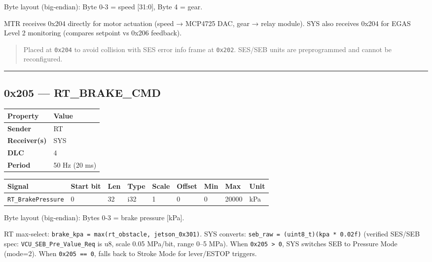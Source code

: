 Byte layout (big-endian): Byte 0-3 = speed {[}31:0{]}, Byte 4 = gear.

MTR receives 0x204 directly for motor actuation (speed → MCP4725 DAC, gear →
relay module). SYS also receives 0x204 for EGAS Level 2 monitoring (compares
setpoint vs 0x206 feedback).

\begin{quote}
Placed at \texttt{0x204} to avoid collision with SES error info frame at
\texttt{0x202}. SES/SEB units are preprogrammed and cannot be reconfigured.
\end{quote}

\begin{center}\rule{0.5\linewidth}{0.5pt}\end{center}

\subsection{0x205 --- RT\_BRAKE\_CMD}\label{x205-rt_brake_cmd}

\begin{longtable}[]{@{}ll@{}}
\toprule\noalign{}
Property & Value \\
\midrule\noalign{}
\endhead
\bottomrule\noalign{}
\endlastfoot
\textbf{Sender} & RT \\
\textbf{Receiver(s)} & SYS \\
\textbf{DLC} & 4 \\
\textbf{Period} & 50 Hz (20 ms) \\
\end{longtable}

\begin{longtable}[]{@{}lllllllll@{}}
\toprule\noalign{}
Signal & Start bit & Len & Type & Scale & Offset & Min & Max & Unit \\
\midrule\noalign{}
\endhead
\bottomrule\noalign{}
\endlastfoot
\texttt{RT\_BrakePressure} & 0 & 32 & i32 & 1 & 0 & 0 & 20000 & kPa \\
\end{longtable}

Byte layout (big-endian): Bytes 0-3 = brake pressure {[}kPa{]}.

RT max-select: \texttt{brake\_kpa\ =\ max(rt\_obstacle,\ jetson\_0x301)}. SYS
converts: \texttt{seb\_raw\ =\ (uint8\_t)(kpa\ *\ 0.02f)} (verified SES/SEB
spec: \texttt{VCU\_SEB\_Pre\_Value\_Req} is u8, scale 0.05 MPa/bit, range 0--5
MPa). When \texttt{0x205\ \textgreater{}\ 0}, SYS switches SEB to Pressure Mode
(mode=2). When \texttt{0x205\ ==\ 0}, falls back to Stroke Mode for lever/ESTOP
triggers.

